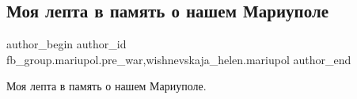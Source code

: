  
 
 
 
 

\subsection{Моя лепта в память о нашем Мариуполе}
\label{sec:09_01_2023.fb.fb_group.mariupol.pre_war.2.moya_lepta_v_pamyat_}
 
\ifcmt
 author_begin
   author_id fb_group.mariupol.pre_war,wishnevskaja_helen.mariupol
 author_end
\fi

Моя лепта в память о нашем Мариуполе.

